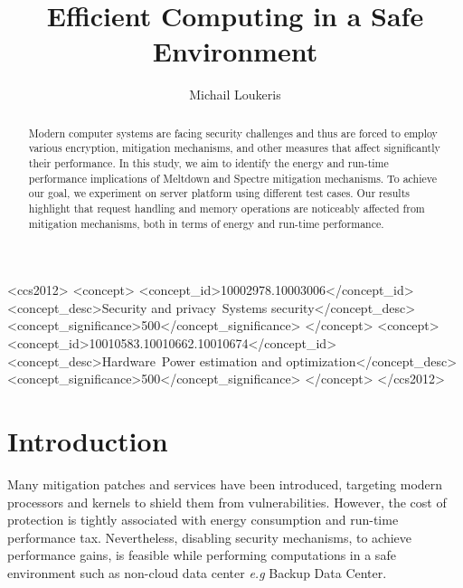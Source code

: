 \documentclass[sigconf, screen]{acmart}
\begin{document}
\title{Efficient Computing in a Safe Environment}
\author{Michail Loukeris}

\renewcommand{\shortauthors}{M. Loukeris}

\begin{abstract}
Modern computer systems are facing security challenges and thus are forced
to employ various encryption, mitigation mechanisms,
and other measures that affect significantly their performance.
In this study, we aim to identify the energy
and run-time performance implications of Meltdown and Spectre mitigation mechanisms.
To achieve our goal, we experiment on server platform using different test cases.
Our results highlight that request handling and memory operations are noticeably affected
from mitigation mechanisms, both in terms of energy and run-time performance.
\end{abstract}

%
\begin{CCSXML}
	<ccs2012>
	<concept>
	<concept_id>10002978.10003006</concept_id>
	<concept_desc>Security and privacy~Systems security</concept_desc>
	<concept_significance>500</concept_significance>
	</concept>
	<concept>
	<concept_id>10010583.10010662.10010674</concept_id>
	<concept_desc>Hardware~Power estimation and optimization</concept_desc>
	<concept_significance>500</concept_significance>
	</concept>
	</ccs2012>
\end{CCSXML}

\maketitle

\section{Introduction}
Many mitigation patches and services have been introduced, targeting 
modern processors and kernels to shield them from vulnerabilities.
However, the cost of protection is tightly associated with energy consumption
and run-time performance tax.
Nevertheless, disabling security mechanisms, to achieve performance gains,
is feasible while performing computations in a safe environment such as non-cloud
data center {\it e.g} Backup Data Center.
\end{document}
